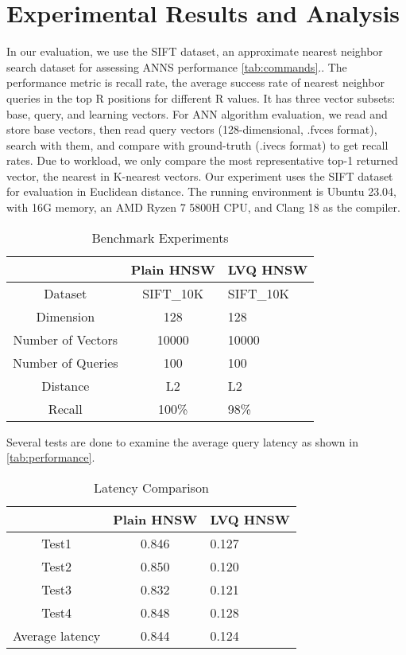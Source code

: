 \documentclass[sigconf, nonacm]{acmart}
\begin{document}
\section{Experimental Results and Analysis}
In our evaluation, we use the SIFT dataset, an approximate nearest neighbor search dataset for assessing ANNS performance \autoref{tab:commands}.. The performance metric is recall rate, the average success rate of nearest neighbor queries in the top R positions for different R values. It has three vector subsets: base, query, and learning vectors. For ANN algorithm evaluation, we read and store base vectors, then read query vectors (128-dimensional, .fvces format), search with them, and compare with ground-truth (.ivecs format) to get recall rates. Due to workload, we only compare the most representative top-1 returned vector, the nearest in K-nearest vectors.
Our experiment uses the SIFT dataset for evaluation in Euclidean distance. The running environment is Ubuntu 23.04, with 16G memory, an AMD Ryzen 7 5800H CPU, and Clang 18 as the compiler.

\begin{table*}[t]
  \caption{Benchmark Experiments}
  \label{tab:commands}
  \begin{tabular}{ccl}
    \toprule
     & Plain HNSW & LVQ HNSW \\
    \midrule
    Dataset & SIFT\_10K & SIFT\_10K \\
    Dimension  & 128 & 128 \\
    Number of Vectors & 10000 & 10000 \\
    Number of Queries & 100 & 100 \\
    Distance  & L2 & L2 \\
    Recall  & 100\% & 98\% \\
    \bottomrule
  \end{tabular}
\end{table*}

Several tests are done to examine the average query latency as shown in \autoref{tab:performance}. 

\begin{table}[hb]%
  \caption{Latency Comparison}
  \label{tab:performance}
  \begin{tabular}{ccl}
    \toprule
     & Plain HNSW & LVQ HNSW\\
    \midrule
    Test1 & 0.846 & 0.127 \\
    Test2 & 0.850 & 0.120 \\
    Test3 & 0.832 & 0.121 \\
    Test4 & 0.848 & 0.128 \\
    Average latency & 0.844 & 0.124 \\
  \bottomrule
\end{tabular}
\end{table}
\end{document}
